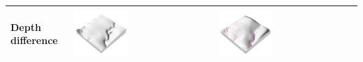 \documentclass[prodmode,acmtochi]{acmsmall} %
\begin{document}
\begin{table}
{\begin{tabular}{m{} m{} m{}}
Depth difference & \includegraphics[width=0.4\textwidth]{images/render_3d/dem_difference_5.png} & \includegraphics[width=0.4\textwidth]{images/render_3d/mean_depth_difference_5.png}\\
\bottomrule
\end{tabular}}
\label{table:} 
\end{table}


\end{document}

